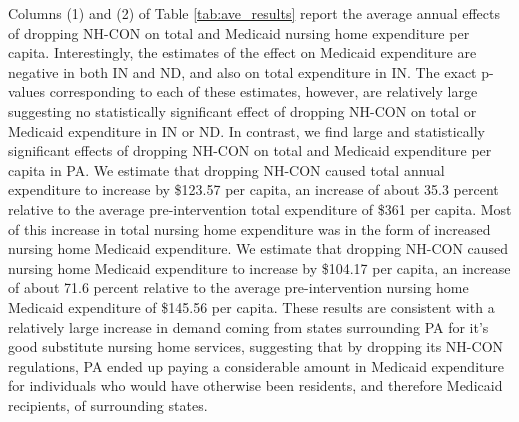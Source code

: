 \documentclass[../Main.tex]{subfiles}
\begin{document}
\indent Columns (1) and (2) of Table \ref{tab:ave_results} report the average annual effects of dropping NH-CON on total and Medicaid nursing home expenditure per capita. Interestingly, the estimates of the effect on Medicaid expenditure are negative in both IN and ND, and also on total expenditure in IN. The exact p-values corresponding to each of these estimates, however, are relatively large suggesting no statistically significant effect of dropping NH-CON on total or Medicaid expenditure in IN or ND. In contrast, we find large and statistically significant effects of dropping NH-CON on total and Medicaid expenditure per capita in PA. We estimate that dropping NH-CON caused total annual expenditure to increase by \$123.57 per capita, an increase of about 35.3 percent relative to the average pre-intervention total expenditure of \$361 per capita. Most of this increase in total nursing home expenditure was in the form of increased nursing home Medicaid expenditure. We estimate that dropping NH-CON caused nursing home Medicaid expenditure to increase by \$104.17 per capita, an increase of about 71.6 percent relative to the average pre-intervention nursing home Medicaid expenditure of \$145.56 per capita. These results are consistent with a relatively large increase in demand coming from states surrounding PA for it's good substitute nursing home services, suggesting that by dropping its NH-CON regulations, PA ended up paying a considerable amount in Medicaid expenditure for individuals who would have otherwise been residents, and therefore Medicaid recipients, of surrounding states.
\end{document}
